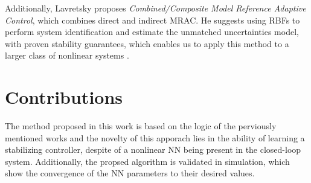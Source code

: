 
Additionally, Lavretsky proposes \textit{Combined/Composite Model Reference Adaptive Control}, which combines direct and indirect MRAC. He suggests using RBFs to perform system identification and estimate the unmatched uncertainties model, with proven stability guarantees, which enables us to apply this method to a larger class of nonlinear systems \cite{lavretskyCombinedCompositeModel2009}.



\section{Contributions}
The method proposed in this work is based on the logic of the perviously mentioned works and the novelty of this apporach lies in the ability of learning a stabilizing controller, despite of a nonlinear NN being present in the closed-loop system. 
Additionally, the propsed algorithm is validated in simulation, which show the convergence of the NN parameters to their desired values.
